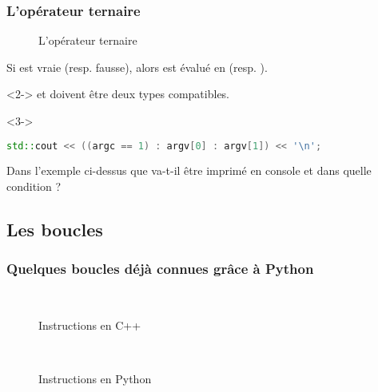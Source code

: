 \documentclass{cppcourses}
\begin{document}
\begin{frame}[fragile]

\frametitle{L'opérateur ternaire}

\begin{figure}
\caption{L'opérateur ternaire}
\end{figure}

Si \mykeyword{\textcolor{red}{condition}} est vraie (resp. fausse), alors  est évalué en \mykeyword{\textcolor{orange}{a}} (resp. \mykeyword{\textcolor{magenta}{b}}).

\begin{warning}<2->
\mykeyword{\textcolor{orange}{a}} et \mykeyword{\textcolor{orange}{b}} doivent être deux types compatibles.
\end{warning}

\begin{example}<3->

\begin{lstlisting}[language = c++]
std::cout << ((argc == 1) : argv[0] : argv[1]) << '\n';
\end{lstlisting}

Dans l'exemple ci-dessus que va-t-il être imprimé en console et dans quelle condition ?


\end{example}

\end{frame}

\subsection{Les boucles}

\begin{frame}

\frametitle{Quelques boucles déjà connues grâce à Python}

\begin{figure}
 \\
\caption{Instructions en C++}
\end{figure}

\begin{figure}
 \\
\caption{Instructions en Python}
\end{figure}

\end{frame}
\end{document}
